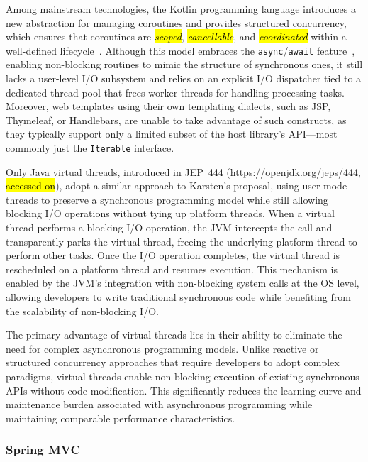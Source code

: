 \documentclass[software,article,accept,pdftex,moreauthors]{Definitions/mdpi}
\begin{document}
Among mainstream technologies, the Kotlin programming language introduces a new
abstraction for managing coroutines and provides structured concurrency, which
ensures that coroutines are \textit{\hl{scoped}}, \textit{\hl{cancellable}}, and
\textit{\hl{coordinated}} within a well-defined
lifecycle~\cite{elizarov2021coroutines}. Although this model embraces the
\texttt{async}/\texttt{await} feature~\cite{async_await}, enabling non-blocking
routines to mimic the structure of synchronous ones, it still lacks a
user-level I/O subsystem and relies on an explicit I/O dispatcher tied to a
dedicated thread pool that frees worker threads for handling processing tasks.
Moreover, web templates using their own templating dialects, such as JSP,
Thymeleaf, or Handlebars, are unable to take advantage of such constructs, as
they typically support only a limited subset of the host library's API---most
commonly just the \texttt{Iterable} interface.

Only Java virtual threads, introduced in
JEP~444 ({\url{https://openjdk.org/jeps/444}}, \hl{accessed on}), adopt a similar approach
to Karsten's proposal, using user-mode threads to preserve a synchronous
programming model while still allowing blocking I/O operations without tying up
platform threads. When a virtual thread performs a blocking I/O operation, the
JVM intercepts the call and transparently parks the virtual thread, freeing the
underlying platform thread to perform other tasks. Once the I/O operation
completes, the virtual thread is rescheduled on a platform thread and resumes
execution. This mechanism is enabled by the JVM's integration with non-blocking
system calls at the OS level, allowing developers to write traditional
synchronous code while benefiting from the scalability of non-blocking I/O.

The primary advantage of virtual threads lies in their ability to eliminate the
need for complex asynchronous programming models. Unlike reactive or structured
concurrency approaches that require developers to adopt complex paradigms, virtual
threads enable non-blocking execution of existing synchronous APIs without code
modification. This significantly reduces the learning curve and maintenance
burden associated with asynchronous programming while maintaining comparable
performance characteristics.

\subsubsection{Spring MVC}
\end{document}
